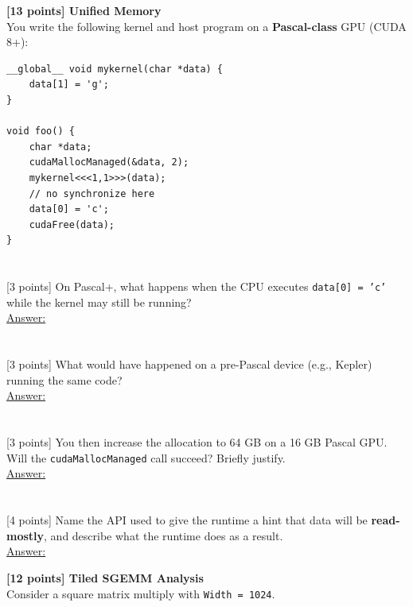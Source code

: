 \documentclass[12pt]{exam}
\newcommand{\Ans}{\underline{Answer:}\ }
\newcommand{\paragraphbox}[1]{\framebox[\linewidth]{\rule{0pt}{#1}}}
\begin{document}
\begin{questions}
\vspace{8pt}
\question \textbf{[13 points] Unified Memory}\\
You write the following kernel and host program on a \textbf{Pascal-class} GPU (CUDA 8+):

\begin{Verbatim}[xleftmargin=1em]
__global__ void mykernel(char *data) {
    data[1] = 'g';
}

void foo() {
    char *data;
    cudaMallocManaged(&data, 2);
    mykernel<<<1,1>>>(data);
    // no synchronize here
    data[0] = 'c';
    cudaFree(data);
}
\end{Verbatim}

\begin{parts}
  \part {}[3 points] On Pascal+, what happens when the CPU executes \texttt{data[0] = 'c'} while
        the kernel may still be running?\\[8pt]
        \Ans \paragraphbox{1.8cm}
  \part {}[3 points] What would have happened on a pre-Pascal device (e.g., Kepler) running the
        same code?\\[8pt]
        \Ans \paragraphbox{1.8cm}
  \part {}[3 points] You then increase the allocation to 64 GB on a 16 GB Pascal GPU. Will the
        \texttt{cudaMallocManaged} call succeed? Briefly justify.\\[8pt]
        \Ans \paragraphbox{1.8cm}
  \part {}[4 points] Name the API used to give the runtime a hint that data will be
        \textbf{read-mostly}, and describe what the runtime does as a result.\\[8pt]
        \Ans \paragraphbox{2.4cm}
\end{parts}

\newpage
\question \textbf{[12 points] Tiled SGEMM Analysis}\\
Consider a square matrix multiply with \texttt{Width = 1024}.


\end{questions}
\end{document}
